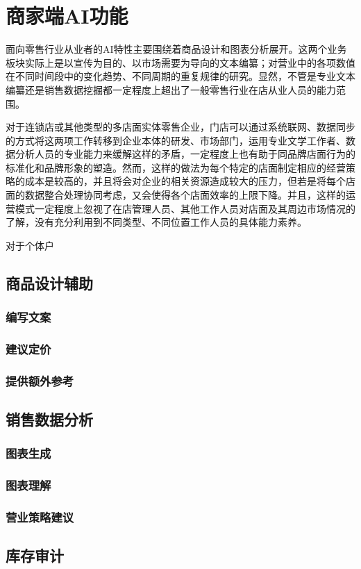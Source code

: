 \newpage
\section{商家端AI功能}
\label{sec:owner_features}

面向零售行业从业者的AI特性主要围绕着商品设计和图表分析展开。这两个业务板块实际上是以宣传为目的、以市场需要为导向的文本编纂；对营业中的各项数值在不同时间段中的变化趋势、不同周期的重复规律的研究。显然，不管是专业文本编纂还是销售数据挖掘都一定程度上超出了一般零售行业在店从业人员的能力范围。

对于连锁店或其他类型的多店面实体零售企业，门店可以通过系统联网、数据同步的方式将这两项工作转移到企业本体的研发、市场部门，运用专业文学工作者、数据分析人员的专业能力来缓解这样的矛盾，一定程度上也有助于同品牌店面行为的标准化和品牌形象的塑造。然而，这样的做法为每个特定的店面制定相应的经营策略的成本是较高的，并且将会对企业的相关资源造成较大的压力，但若是将每个店面的数据整合处理协同考虑，又会使得各个店面效率的上限下降。并且，这样的运营模式一定程度上忽视了在店管理人员、其他工作人员对店面及其周边市场情况的了解，没有充分利用到不同类型、不同位置工作人员的具体能力素养。

对于个体户

\subsection{商品设计辅助}

\subsubsection{编写文案}

\subsubsection{建议定价}

\subsubsection{提供额外参考}

\subsection{销售数据分析}

\subsubsection{图表生成}

\subsubsection{图表理解}

\subsubsection{营业策略建议}

\subsection{库存审计}